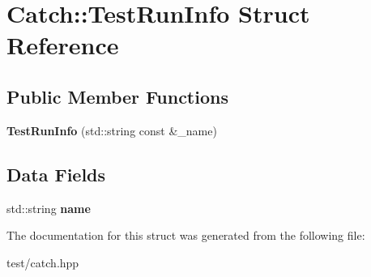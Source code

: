 \hypertarget{structCatch_1_1TestRunInfo}{}\section{Catch\+:\+:Test\+Run\+Info Struct Reference}
\label{structCatch_1_1TestRunInfo}
\subsection*{Public Member Functions}
\begin{DoxyCompactItemize}
\item 
{\bfseries Test\+Run\+Info} (std\+::string const \&\+\_\+name)\hypertarget{structCatch_1_1TestRunInfo_afb422b8d6e849134b669551b91d977b8}{}\label{structCatch_1_1TestRunInfo_afb422b8d6e849134b669551b91d977b8}

\end{DoxyCompactItemize}
\subsection*{Data Fields}
\begin{DoxyCompactItemize}
\item 
std\+::string {\bfseries name}\hypertarget{structCatch_1_1TestRunInfo_a20bd016d4066e066b6f72f218ad389fd}{}\label{structCatch_1_1TestRunInfo_a20bd016d4066e066b6f72f218ad389fd}

\end{DoxyCompactItemize}


The documentation for this struct was generated from the following file\+:\begin{DoxyCompactItemize}
\item 
test/catch.\+hpp\end{DoxyCompactItemize}
